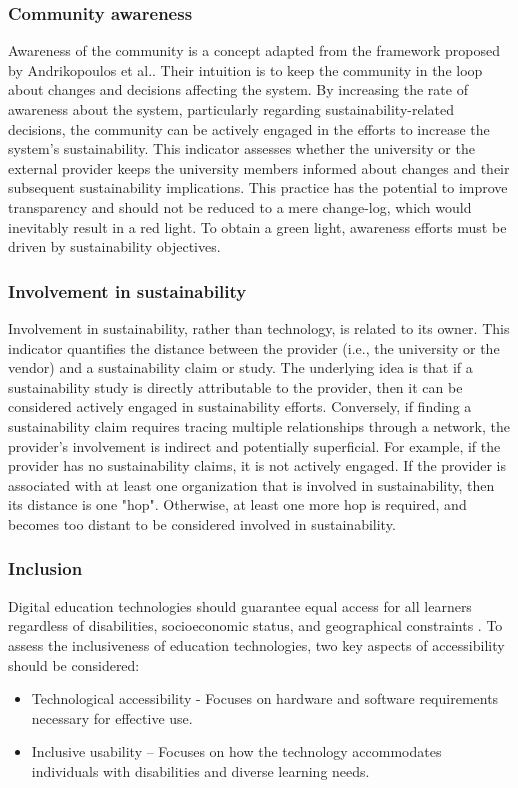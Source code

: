 \subsubsection{Community awareness}
Awareness of the community is a concept adapted from the framework proposed by Andrikopoulos et al.\cite{andrikopoulos_software_2021}. Their intuition is to keep the community in the loop about changes and decisions affecting the system. By increasing the rate of awareness about the system, particularly regarding sustainability-related decisions, the community can be actively engaged in the efforts to increase the system's sustainability. This indicator assesses whether the university or the external provider keeps the university members informed about changes and their subsequent sustainability implications. This practice has the potential to improve transparency and should not be reduced to a mere change-log, which would inevitably result in a red light. To obtain a green light, awareness efforts must be driven by sustainability objectives.

\subsubsection{Involvement in sustainability}
Involvement in sustainability, rather than technology, is related to its owner. This indicator quantifies the distance between the provider (i.e., the university or the vendor) and a sustainability claim or study. The underlying idea is that if a sustainability study is directly attributable to the provider, then it can be considered actively engaged in sustainability efforts. Conversely, if finding a sustainability claim requires tracing multiple relationships through a network, the provider’s involvement is indirect and potentially superficial. For example, if the provider has no sustainability claims, it is not actively engaged. If the provider is associated with at least one organization that is involved in sustainability, then its distance is one "hop". Otherwise, at least one more hop is required, and becomes too distant to be considered involved in sustainability.

\subsubsection{Inclusion}
Digital education technologies should guarantee equal access for all learners regardless of disabilities, socioeconomic status, and geographical constraints \cite{haleem_understanding_2022}. To assess the inclusiveness of education technologies, two key aspects of accessibility should be considered:
\begin{itemize}[noitemsep, topsep=4pt, parsep=0pt, partopsep=0pt]
    \item Technological accessibility - Focuses on hardware and software requirements necessary for effective use.
    \item Inclusive usability – Focuses on how the technology accommodates individuals with disabilities and diverse learning needs.
\end{itemize}

